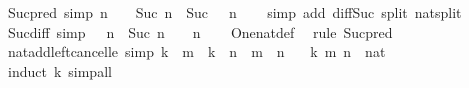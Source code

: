 \begin{isabellebody}
%
\isamarkuptrue%
%
\endisatagdocument
{\isafolddocument}%
%
\isadelimdocument
%
\endisadelimdocument
{}\isamarkupfalse%
\ Suc{\isacharunderscore}{\kern0pt}pred\ {\isacharbrackleft}{\kern0pt}simp{\isacharbrackright}{\kern0pt}{\isacharcolon}{\kern0pt}\ {\isachardoublequoteopen}n\ {\isachargreater}{\kern0pt}\ {}\ {\isasymLongrightarrow}\ Suc\ {\isacharparenleft}{\kern0pt}n\ {\isacharminus}{\kern0pt}\ Suc\ {}{\isacharparenright}{\kern0pt}\ {\isacharequal}{\kern0pt}\ n{\isachardoublequoteclose}\isanewline
%
\isadelimproof
\ \ %
\endisadelimproof
%
\isatagproof
{}\isamarkupfalse%
\ {\isacharparenleft}{\kern0pt}simp\ add{\isacharcolon}{\kern0pt}\ diff{\isacharunderscore}{\kern0pt}Suc\ split{\isacharcolon}{\kern0pt}\ nat{\isachardot}{\kern0pt}split{\isacharparenright}{\kern0pt}%
\endisatagproof
{\isafoldproof}%
%
\isadelimproof
\isanewline
%
\endisadelimproof
\isanewline
{}\isamarkupfalse%
\ Suc{\isacharunderscore}{\kern0pt}diff{\isacharunderscore}{\kern0pt}{}\ {\isacharbrackleft}{\kern0pt}simp{\isacharbrackright}{\kern0pt}{\isacharcolon}{\kern0pt}\ {\isachardoublequoteopen}{}\ {\isacharless}{\kern0pt}\ n\ {\isasymLongrightarrow}\ Suc\ {\isacharparenleft}{\kern0pt}n\ {\isacharminus}{\kern0pt}\ {}{\isacharparenright}{\kern0pt}\ {\isacharequal}{\kern0pt}\ n{\isachardoublequoteclose}\isanewline
%
\isadelimproof
\ \ %
\endisadelimproof
%
\isatagproof
{}\isamarkupfalse%
\ One{\isacharunderscore}{\kern0pt}nat{\isacharunderscore}{\kern0pt}def\ \isamarkupfalse%
\ {\isacharparenleft}{\kern0pt}rule\ Suc{\isacharunderscore}{\kern0pt}pred{\isacharparenright}{\kern0pt}%
\endisatagproof
{\isafoldproof}%
%
\isadelimproof
\isanewline
%
\endisadelimproof
\isanewline
{}\isamarkupfalse%
\ nat{\isacharunderscore}{\kern0pt}add{\isacharunderscore}{\kern0pt}left{\isacharunderscore}{\kern0pt}cancel{\isacharunderscore}{\kern0pt}le\ {\isacharbrackleft}{\kern0pt}simp{\isacharbrackright}{\kern0pt}{\isacharcolon}{\kern0pt}\ {\isachardoublequoteopen}k\ {\isacharplus}{\kern0pt}\ m\ {\isasymle}\ k\ {\isacharplus}{\kern0pt}\ n\ {\isasymlongleftrightarrow}\ m\ {\isasymle}\ n{\isachardoublequoteclose}\isanewline
\ \ \ k\ m\ n\ {\isacharcolon}{\kern0pt}{\isacharcolon}{\kern0pt}\ nat\isanewline
%
\isadelimproof
\ \ %
\endisadelimproof
%
\isatagproof
{}\isamarkupfalse%
\ {\isacharparenleft}{\kern0pt}induct\ k{\isacharparenright}{\kern0pt}\ simp{\isacharunderscore}{\kern0pt}all%

\end{isabellebody}
